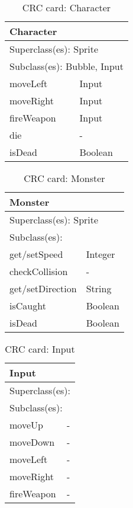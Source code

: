 \begin{table}[]
\centering
\label{crc_character}
\begin{tabular}{|l|l|}
\hline
\multicolumn{2}{|l|}{Character} \\ \hline
\multicolumn{2}{|l|}{Superclass(es): Sprite} \\ \hline
\multicolumn{2}{|l|}{Subclass(es): Bubble, Input} \\ \hline
moveLeft            & Input \\ \hline
moveRight           & Input \\ \hline
fireWeapon          & Input \\ \hline
die                 & - \\ \hline
isDead              & Boolean \\ \hline
\end{tabular}
\caption{CRC card: Character}
\end{table}

\begin{table}[]
\centering
\label{crc_monster}
\begin{tabular}{|l|l|}
\hline
\multicolumn{2}{|l|}{Monster} \\ \hline
\multicolumn{2}{|l|}{Superclass(es): Sprite} \\ \hline
\multicolumn{2}{|l|}{Subclass(es):} \\ \hline
get/setSpeed            & Integer \\ \hline
checkCollision          & -\\ \hline
get/setDirection        & String\\ \hline
isCaught                & Boolean \\ \hline
isDead                  & Boolean \\ \hline
\end{tabular}
\caption{CRC card: Monster}
\end{table}

\begin{table}[]
\centering
\label{crc_input}
\begin{tabular}{|l|l|}
\hline
\multicolumn{2}{|l|}{Input} \\ \hline
\multicolumn{2}{|l|}{Superclass(es):} \\ \hline
\multicolumn{2}{|l|}{Subclass(es):} \\ \hline
moveUp          & -\\ \hline
moveDown        & - \\ \hline
moveLeft        & -\\ \hline
moveRight       & -\\ \hline
fireWeapon      & - \\ \hline
\end{tabular}
\caption{CRC card: Input}
\end{table}

